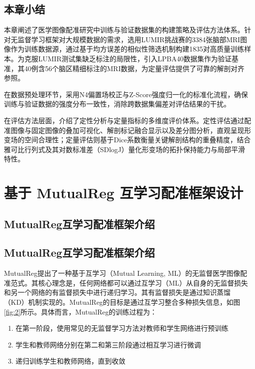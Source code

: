 \section{本章小结}

本章阐述了医学图像配准研究中训练与验证数据集的构建策略及评估方法体系。针对无监督学习框架对大规模数据的需求，选用LUMIR挑战赛的3384张脑部MRI图像作为训练数据源，通过基于均方误差的相似性筛选机制构建1835对高质量训练样本。为克服LUMIR测试集缺乏标注的局限性，引入LPBA40数据集作为验证基准，其40例含56个脑区精细标注的MRI数据，为定量评估提供了可靠的解剖对齐参照。

在数据预处理环节，采用N4偏置场校正与Z-Score强度归一化的标准化流程，确保训练与验证数据的强度分布一致性，消除跨数据集偏差对评估结果的干扰。

在评估方法层面，介绍了定性分析与定量指标的多维度评价体系。定性评估通过配准图像与固定图像的叠加可视化、解剖标记融合显示以及差分图分析，直观呈现形变场的空间合理性；定量评估则基于Dice系数衡量关键解剖结构的重叠精度，结合雅可比行列式及其对数标准差（SDlogJ）量化形变场的拓扑保持能力与局部平滑特性。


\chapter{基于 MutualReg 互学习配准框架设计}

\section{MutualReg互学习配准框架介绍}

\section{MutualReg互学习配准框架介绍}

MutualReg\cite{liu2024mutualreg}提出了一种基于互学习（Mutual Learning, ML）的无监督医学图像配准范式。其核心理念是，任何网络都可以通过互学习（ML）从自身的无监督损失和另一个网络的有监督损失中进行递归学习。其有监督损失是通过知识蒸馏（KD）机制实现的。MutualReg的目标是通过互学习整合多种损失信息，如图\ref{fig:2}所示。具体而言，MutualReg的训练过程为：

\begin{enumerate}
    \item 在第一阶段，使用常见的无监督学习方法对教师和学生网络进行预训练
    \item 学生和教师网络分别在第二和第三阶段通过相互学习进行微调
    \item 递归训练学生和教师网络，直到收敛
\end{enumerate}

